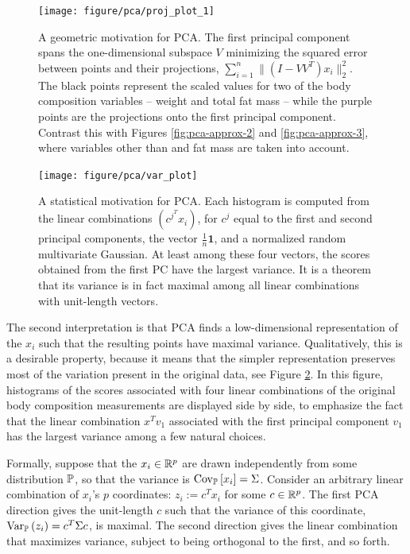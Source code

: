 \documentclass[14pt]{extarticle}
\begin{document}
\begin{figure}
  \centering
  \texttt{[image: figure/pca/proj\_plot\_1]}
  \caption{A geometric motivation for PCA. The first principal component spans
    the one-dimensional subspace $V$ minimizing the squared error between points
    and their projections, $\sum_{i = 1}^{n}\|\left(I -
    VV^{T}\right)x_{i}\|_{2}^{2}$. The black points represent the scaled values
    for two of the body composition variables -- weight and total fat mass --
    while the purple points are the projections onto the first principal
    component. Contrast this with Figures \ref{fig:pca-approx-2} and
    \ref{fig:pca-approx-3}, where variables other than and fat mass are taken
    into account.}
  \label{fig:pca-approx}
\end{figure}

\begin{figure}
  \centering
  \texttt{[image: figure/pca/var\_plot]}
  \caption{A statistical motivation for PCA. Each histogram is computed from the
    linear combinations $\left(c^{j^{T}}x_{i}\right)$, for $c^{j}$ equal
    to the first and second principal components, the vector
    $\frac{1}{n}\mathbf{1}$, and a normalized random multivariate Gaussian. At
    least among these four vectors, the scores obtained from the first PC have
    the largest variance. It is a theorem that its variance is in fact maximal
    among all linear combinations with unit-length vectors.}
  \label{fig:pca-var}
\end{figure}

The second interpretation is that PCA finds a low-dimensional representation of
the $x_{i}$ such that the resulting points have maximal variance. Qualitatively,
this is a desirable property, because it means that the simpler representation
preserves most of the variation present in the original data, see Figure
\ref{fig:pca-var}. In this figure, histograms of the scores associated with four
linear combinations of the original body composition measurements are displayed
side by side, to emphasize the fact that the linear combination $x^{T}v_{1}$
associated with the first principal component $v_{1}$ has the largest variance
among a few natural choices.

Formally, suppose that the $x_{i}\in\reals^{p}$ are drawn
independently from some distribution $\P$, so that the variance is
$\Covsubarg{\P}{x_{i}} = \Sigma$. Consider an arbitrary linear combination of
$x_{i}$'s $p$ coordinates: $z_{i} := c^{T}x_{i}$ for some $c \in \reals^{p}$.
The first PCA direction gives the unit-length $c$ such that the variance of this
coordinate, $\Varsubarg{\P}{z_{i}} = c^{T}\Sigma c$, is maximal. The second
direction gives the linear combination that maximizes variance, subject to being
orthogonal to the first, and so forth.
\end{document}
